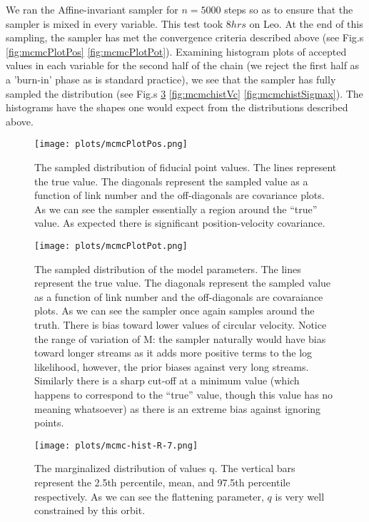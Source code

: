 \documentclass[12pt,preprint]{aastex}
\theoremstyle{plain}
\theoremstyle{definition}
\begin{document}
We ran the Affine-invariant sampler for $n = 5000$ steps so 
as to ensure that the sampler is mixed in every variable. This test took $8 hrs$ on Leo. At the end of this sampling,  the sampler has met 
the convergence criteria described above (see Fig.s \eqref{fig:mcmcPlotPos} \eqref{fig:mcmcPlotPot}). 
Examining histogram plots of accepted values in each variable for the second half of the chain (we reject 
the first half as a 'burn-in' phase as is standard practice), we see that the sampler has fully sampled the 
distribution (see Fig.s \ref{fig:mcmchistq} \ref{fig:mcmchistVc} \ref{fig:mcmchistSigmax}). The 
histograms have the shapes one would expect from the distributions described above. 
\begin{figure}[ht]
\begin{center}
\texttt{[image: plots/mcmcPlotPos.png]}
\caption{The sampled distribution of fiducial point values. The lines represent the true value. The diagonals represent the sampled value as a function of link number and the off-diagonals are covariance plots. As we can see the sampler essentially a region around the ``true'' value. As expected there is significant position-velocity covariance. }
\label{fig:mcmcPlotPos}
\end{center}
\end{figure}
\begin{figure}[ht]
\begin{center}
\texttt{[image: plots/mcmcPlotPot.png]}
\caption{The sampled distribution of the model parameters. The lines represent the true value. The diagonals represent the sampled value as a function of link number and the off-diagonals are covaraiance plots. As we can see the sampler once again samples around the truth. There is bias toward lower values of circular velocity. Notice the range of variation of M: the sampler naturally would have bias toward longer streams as it adds more positive terms to the log likelihood, however, the prior biases against very long streams. Similarly there is a sharp cut-off at a minimum value (which happens to correspond to the ``true'' value, though this value has no meaning whatsoever) as there is an extreme bias against ignoring points.}
\label{fig:mcmcPlotPot}
\end{center}
\end{figure}
\begin{figure}[ht]
\begin{center}
\texttt{[image: plots/mcmc-hist-R-7.png]}
\caption{The marginalized distribution of values q. The vertical bars represent the 2.5th percentile, mean, and 97.5th percentile respectively. As we can see the flattening parameter, $q$ is very well constrained by this orbit.}
\label{fig:mcmchistq}
\end{center}
\end{figure}
\end{document}
